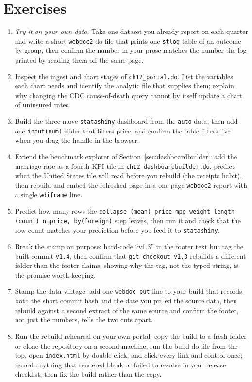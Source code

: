 \documentclass[
    a4paper,
    fontsize=10pt,
    twoside=true,
    numbers=noenddot,
]{kaobook}
\begin{document}
\section*{Exercises}
\begin{enumerate}
\item \emph{Try it on your own data.} Take one dataset you already report on each quarter and write a short \texttt{webdoc2} do-file that prints one \texttt{stlog} table of an outcome by group, then confirm the number in your prose matches the number the log printed by reading them off the same page.
\item Inspect the ingest and chart stages of \texttt{ch12\_portal.do}. List the variables each chart needs and identify the analytic file that supplies them; explain why changing the CDC cause-of-death query cannot by itself update a chart of uninsured rates.
\item Build the three-move \texttt{statashiny} dashboard from the \texttt{auto} data, then add one \texttt{input(num)} slider that filters price, and confirm the table filters live when you drag the handle in the browser.
\item Extend the benchmark explorer of Section~\ref{sec:dashboardbuilder}: add the marriage rate as a fourth KPI tile in \texttt{ch12\_dashboardbuilder.do}, predict what the United States tile will read before you rebuild (the receipts habit), then rebuild and embed the refreshed page in a one-page \texttt{webdoc2} report with a single \texttt{wdiframe} line.
\item Predict how many rows the \texttt{collapse (mean) price mpg weight length (count) n=price, by(foreign)} step leaves, then run it and check that the row count matches your prediction before you feed it to \texttt{statashiny}.
\item Break the stamp on purpose: hard-code \enquote{v1.3} in the footer text but tag the built commit \texttt{v1.4}, then confirm that \texttt{git checkout v1.3} rebuilds a different folder than the footer claims, showing why the tag, not the typed string, is the promise worth keeping.
\item Stamp the data vintage: add one \texttt{webdoc put} line to your build that records both the short commit hash and the date you pulled the source data, then rebuild against a second extract of the same source and confirm the footer, not just the numbers, tells the two cuts apart.
\item Run the rebuild rehearsal on your own portal: copy the build to a fresh folder or clone the repository on a second machine, run the build do-file from the top, open \texttt{index.html} by double-click, and click every link and control once; record anything that rendered blank or failed to resolve in your release checklist, then fix the build rather than the copy.
\end{enumerate}
\end{document}
